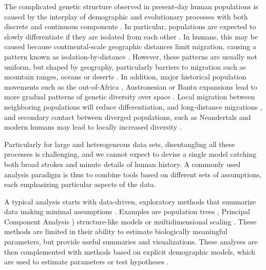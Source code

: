 \documentclass[12pt,fullpage, a4paper]{article}
\begin{document}
The complicated genetic structure observed in present-day human populations \citep{the2015, mallick2016} is caused by the interplay of demographic and evolutionary processes with both discrete and continuous components \citep{pritchard2000, rosenberg2002a, serre2004, rosenberg2005, bradburd2018, reich2018a, peter2020a, gopalan2022}.
In particular, populations are expected to slowly differentiate if they are isolated from each other \citep{wahlund1928,cavalli-sforza1975}. In humans, this may be caused because continental-scale geographic distances limit migration, causing a pattern known as isolation-by-distance \citep{slatkin1985}. However, these patterns are usually not uniform, but shaped by geography, particularly barriers  to migration such as mountain ranges, oceans or deserts \citep{cavalli-sforza1994, barbujani1990, rosenberg2005, bradburd2013, peter2020a}. In addition,  major historical population movements such as the out-of-Africa \citep{ramachandran2005}, Austronesian \citep{stoneking2016} or Bantu expansions \citep{li2014} lead to more gradual patterns of genetic diversity over space \citep{francois2010}. Local migration between neighboring populations will reduce differentiation, and long-distance migrations \citep{alves2016}, and secondary contact between diverged populations, such as Neandertals and modern humans \citep{green2010} may lead to locally increased diversity \citep{boca2020}.

Particularly for large and heterogeneous data sets, disentangling all these processes is challenging, and we cannot expect to devise a single model catching both broad strokes and minute details of human history. A commonly used analysis paradigm is thus to combine tools based on different sets of assumptions, each emphasizing particular aspects of the data.

A typical analysis starts with data-driven, exploratory methods that summarize data making minimal assumptions \citep[e.g.][]{schraiber2015}. Examples are population trees \citep{cavalli-sforza1967, felsenstein1973, cavalli-sforza1975}, Principal Component Analysis \citep[PCA, ][]{cavalli-sforza1994, jombart2009, patterson2006}) structure-like models \citep{pritchard2000, alexander2009} or multidimensional scaling \citep[MDS][]{lessa1990}. These methods are limited in their ability to estimate biologically meaningful parameters, but provide useful summaries and visualizations. These analyses are then complemented with methods based on explicit demographic models, which are used to estimate parameters or test hypotheses \citep{gutenkunst2009, excoffier2013, kamm2015}. 
\end{document}
